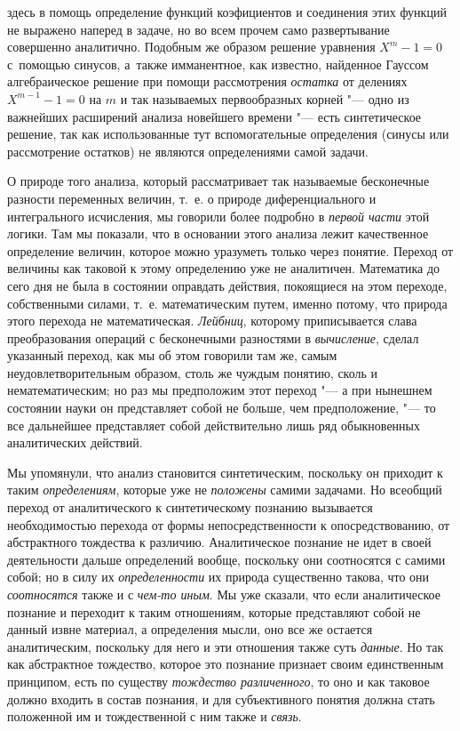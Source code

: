здесь в помощь определение функций коэфициентов и соединения этих функций не
выражено наперед в задаче, но во всем прочем само развертывание совершенно
аналитично. Подобным же образом решение уравнения $X^m-1=0$ с~помощью синусов,
а~также имманентное, как известно, найденное Гауссом алгебраическое
решение при помощи рассмотрения {\em остатка} от делениях $X^{m-1}-1=0$ на $m$
и так называемых первообразных корней "--- одно из важнейших расширений анализа
новейшего времени "--- есть синтетическое решение, так как использованные тут
вспомогательные определения (синусы или рассмотрение остатков) не являются
определениями самой задачи.

О природе того анализа, который рассматривает так называемые
бесконечные разности переменных величин, т.~е. о природе диференциального и
интегрального исчисления, мы говорили более подробно в
{\em первой части} этой
логики. Там мы показали, что в основании этого анализа лежит качественное
определение величин, которое можно уразуметь только через понятие. Переход
от величины как таковой к этому определению уже не аналитичен. Математика
до сего дня не была в состоянии оправдать действия, покоящиеся на этом
переходе, собственными силами, т.~е. математическим путем, именно потому,
что природа этого перехода не математическая.
{\em Лейбниц}, которому
приписывается слава преобразования операций с бесконечными разностями в
{\em вычисление}, сделал
указанный переход, как мы об этом говорили там же, самым
неудовлетворительным образом, столь же чуждым понятию, сколь и
нематематическим; но раз мы предположим этот переход "--- а при
нынешнем состоянии науки он представляет собой не больше, чем
предположение, "--- то все дальнейшее представляет собой
действительно лишь ряд обыкновенных аналитических действий.

Мы упомянули, что анализ становится синтетическим, поскольку
он приходит к таким {\em определениям},
которые уже не
{\em положены} самими
задачами. Но всеобщий переход от аналитического к синтетическому познанию
вызывается необходимостью перехода от формы непосредственности к
опосредствованию, от абстрактного тождества к различию. Аналитическое
познание не идет в своей деятельности дальше определений вообще, поскольку
они соотносятся с самими собой; но в силу их
{\em определенности} их
природа существенно такова, что они
{\em соотносятся} также и
с {\em чем-то иным}.
Мы уже сказали, что если аналитическое познание и переходит к
таким отношениям, которые представляют собой не данный извне материал, а
определения мысли, оно все же остается аналитическим, поскольку для него и
эти отношения также суть {\em данные}.
Но так как абстрактное тождество, которое это познание
признает своим единственным принципом, есть по существу
{\em тождество различенного},
то оно и как таковое должно входить в состав
познания, и для субъективного понятия должна стать положенной им и
тождественной с ним также и
{\em связь}.


